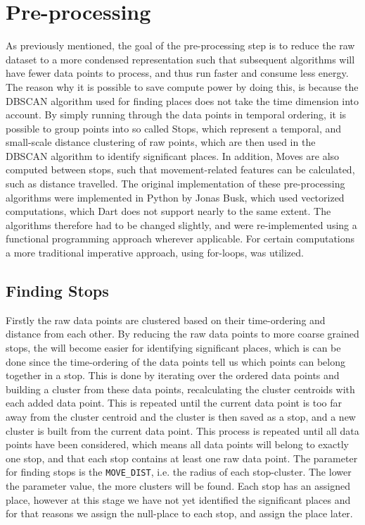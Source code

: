\section{Pre-processing}
As previously mentioned, the goal of the pre-processing step is to reduce the raw dataset to a more condensed representation such that subsequent algorithms will have fewer data points to process, and thus run faster and consume less energy. The reason why it is possible to save compute power by doing this, is because the DBSCAN algorithm used for finding places does not take the time dimension into account. By simply running through the data points in temporal ordering, it is possible to group points into so called Stops, which represent a temporal, and small-scale distance clustering of raw points, which are then used in the DBSCAN algorithm to identify significant places. In addition, Moves are also computed between stops, such that movement-related features can be calculated, such as distance travelled. The original implementation of these pre-processing algorithms were implemented in Python by Jonas Busk, which used vectorized computations, which Dart does not support nearly to the same extent. The algorithms therefore had to be changed slightly, and were re-implemented using a functional programming approach wherever applicable. For certain computations a more traditional imperative approach, using for-loops, was utilized.

\subsection{Finding Stops}
Firstly the raw data points are clustered based on their time-ordering and distance from each other. By reducing the raw data points to more coarse grained stops, the will become easier for identifying significant places, which is can be done since the time-ordering of the data points tell us which points can belong together in a stop. This is done by iterating over the ordered data points and building a cluster from these data points, recalculating the cluster centroids with each added data point. This is repeated until the current data point is too far away from the cluster centroid and the cluster is then saved as a stop, and a new cluster is built from the current data point. This process is repeated until all data points have been considered, which means all data points will belong to exactly one stop, and that each stop contains at least one raw data point. The parameter for finding stops is the \verb|MOVE_DIST|, i.e. the radius of each stop-cluster. The lower the parameter value, the more clusters will be found. Each stop has an assigned place, however at this stage we have not yet identified the significant places and for that reasons we assign the null-place to each stop, and assign the place later.

